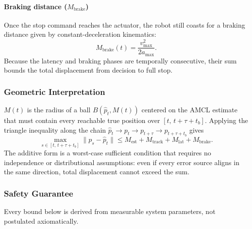 \documentclass[conference]{IEEEtran}
\begin{document}
\paragraph{Braking distance ($M_{\mathrm{brake}}$)}
Once the stop command reaches the actuator, the robot still coasts for a braking distance given by constant-deceleration kinematics:
\begin{equation}
M_{\mathrm{brake}}(t) = \frac{v_{\max}^2}{2a_{\max}}.
\end{equation}
Because the latency and braking phases are temporally consecutive, their sum bounds the total displacement from decision to full stop.

\subsubsection{Geometric Interpretation}
$M(t)$ is the radius of a ball $B(\hat{p}_t, M(t))$ centered on the AMCL estimate that must contain every reachable true position over $[t,\, t{+}\tau{+}t_b]$. Applying the triangle inequality along the chain $\hat{p}_t \to p_t \to p_{t+\tau} \to p_{t+\tau+t_b}$ gives
\begin{equation}
\max_{s \in [t,\, t+\tau+t_b]} \|p_s - \hat{p}_t\| \le M_{\mathrm{est}} + M_{\mathrm{track}}
          + M_{\mathrm{lat}} + M_{\mathrm{brake}}.
\label{eq:triangle}
\end{equation}
The additive form is a worst-case sufficient condition that requires no independence or distributional assumptions: even if every error source aligns in the same direction, total displacement cannot exceed the sum.

\subsubsection{Safety Guarantee}\label{sec:formal}
Every bound below is derived from measurable system parameters, not postulated axiomatically.
\end{document}

